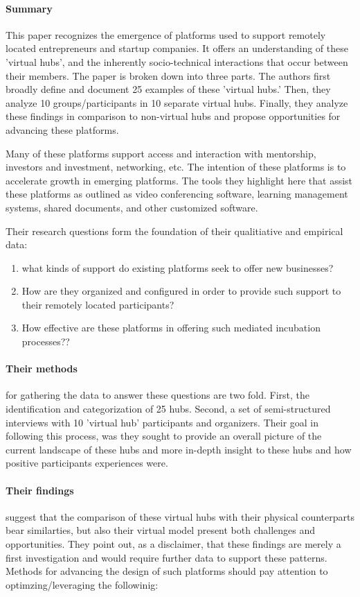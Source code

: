 \paragraph{Summary}
This paper recognizes the emergence of platforms used to support remotely located entrepreneurs and startup companies. It offers an understanding of these 'virtual hubs', and the inherently socio-technical interactions that occur between their members. The paper is broken down into three parts. The authors first broadly define and document 25 examples of these 'virtual hubs.' Then, they analyze 10 groups/participants in 10 separate virtual hubs. Finally, they analyze these findings in comparison to non-virtual hubs and propose opportunities for advancing these platforms.

Many of these platforms support access and interaction with mentorship, investors and investment, networking, etc. The intention of these platforms is to accelerate growth in emerging platforms. The tools they highlight here that assist these platforms as outlined as video conferencing software, learning management systems, shared documents, and other customized software.

Their research questions form the foundation of their qualitiative and empirical data:

\begin{enumerate}
\item
  what kinds of support do existing platforms seek to offer new businesses?
\item
  How are they organized and configured in order to provide such support to their remotely located participants?
\item
  How effective are these platforms in offering such mediated incubation processes??
\end{enumerate}

\paragraph{Their methods} for gathering the data to answer these questions are two fold. First, the identification and categorization of 25 hubs. Second, a set of semi-structured interviews with 10 'virtual hub' participants and organizers. Their goal in following this process, was they sought to provide an overall picture of the current landscape of these hubs and more in-depth insight to these hubs and how positive participants experiences were.

\paragraph{Their findings} suggest that the comparison of these virtual hubs with their physical counterparts bear similarties, but also their virtual model present both challenges and opportunities. They point out, as a disclaimer, that these findings are merely a first investigation and would require further data to support these patterns. Methods for advancing the design of such platforms should pay attention to optimzing/leveraging the followinig:

